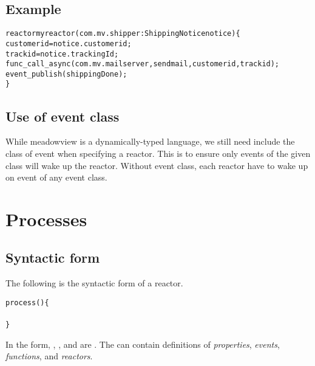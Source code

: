 \documentclass{note}\usepackage{mathptm,mydef}
\begin{document}
\subsection{Example}
\begin{alltt}
  \textcolor{red2}{reactor {myreactor}(com.mv.shipper:ShippingNotice notice) \{
    customerid = notice.customerid;
    trackid = notice.trackingId;
    func_call_async(com.mv.mailserver, sendmail, customerid, trackid);
    event\_publish(shippingDone);
  \}}
\end{alltt}

\subsection{Use of event class}
While meadowview is a dynamically-typed language, we still need
include the class of event when specifying a reactor.
This is to ensure only events of the given class will wake
up the reactor. Without event class, each reactor have to wake up 
on event of any event class.




\section{Processes}
\subsection{Syntactic form}
The following is the syntactic form of a reactor.
\begin{alltt}
  \textcolor{red2}{process \textrm{}(\textrm{} \textrm{}) \{
    \textrm{}
  \}}
\end{alltt}
In the form, , , and 
are .
The  can contain definitions of 
  {\em properties\/}, 
  {\em events\/}, 
  {\em functions\/}, and {\em reactors\/}.
\end{document}
